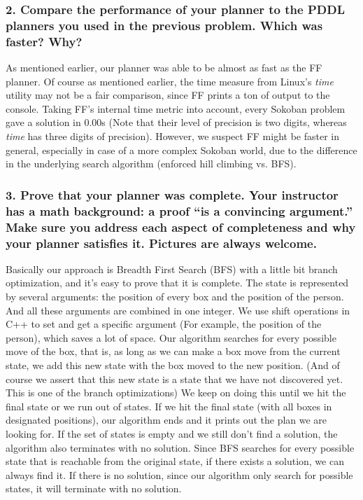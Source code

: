 \documentclass[10pt, letter]{article}
\begin{document}
\subsubsection*{2. Compare the performance of your planner to the PDDL planners you used in the previous
problem. Which was faster? Why?}
As mentioned earlier, our planner was able to be almost as fast as the FF planner. Of course as mentioned earlier, the time measure from Linux's \textit{time} utility may not be a fair comparison, since FF prints a ton of output to the console. Taking FF's internal time metric into account, every Sokoban problem gave a solution in 0.00s (Note that their level of precision is two digits, whereas \textit{time} has three digits of precision). However, we suspect FF might be faster in general, especially in case of a more complex Sokoban world, due to the difference in the underlying search algorithm (enforced hill climbing vs. BFS).

\subsubsection*{3. Prove that your planner was complete. Your instructor has a math background: a proof ``is
a convincing argument.'' Make sure you address each aspect of completeness and why your
planner satisfies it. Pictures are always welcome.}
Basically our approach is Breadth First Search (BFS) with a little bit branch optimization, and it's easy to prove that it is complete.
The state is represented by several arguments: the position of every box and the position of the person.
And all these arguments are combined in one integer.
We use shift operations in C++ to set and get a specific argument (For example, the position of the person), which saves a lot of space.
Our algorithm searches for every possible move of the box, that is, as long as we can make a box move from the current state, we add this new state with the box moved to the new position. 
(And of course we assert that this new state is a state that we have not discovered yet. This is one of the branch optimizations)
We keep on doing this until we hit the final state or we run out of states.
If we hit the final state (with all boxes in designated positions), our algorithm ends and it prints out the plan we are looking for.
If the set of states is empty and we still don't find a solution, the algorithm also terminates with no solution.
Since BFS searches for every possible state that is reachable from the original state, if there exists a solution, we can always find it.
If there is no solution, since our algorithm only search for possible states, it will terminate with no solution.
\end{document}
